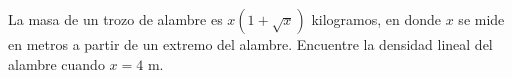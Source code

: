 \item La masa de un trozo de alambre es $x(1 + \sqrt{x})$ kilogramos, en donde $x$ se mide en metros a partir de un extremo del alambre. Encuentre la densidad lineal del alambre cuando $x = 4 \text{ m}$.
